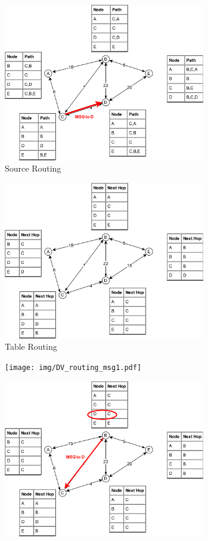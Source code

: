 \documentclass{article}
\begin{document}
\begin{figure}
  \includegraphics[width=250pt]{img/LS_routing_msg3.pdf}
  \caption{Source Routing}
  \label{fig:LSmsg_3}
\end{figure}

\begin{figure}
  \includegraphics[width=250pt]{img/DV_routing.pdf}
  \caption{Table Routing}
  \label{fig:DV}
\end{figure}

\begin{figure}
  \texttt{[image: img/DV\_routing\_msg1.pdf]}
\end{figure}

\begin{figure}
  \includegraphics[width=250pt]{img/DV_routing_msg2.pdf}
\end{figure}
\end{document}
